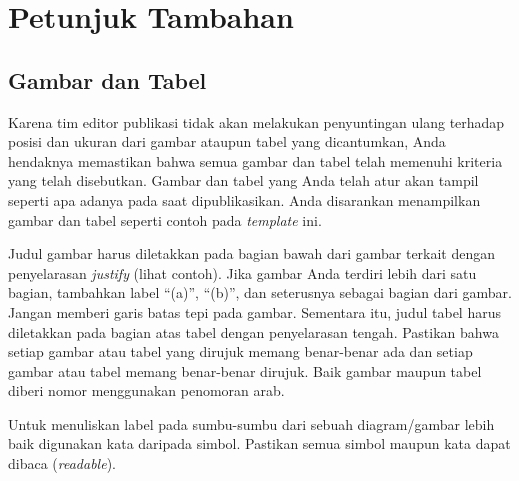 \documentclass{its-jurnal}
\begin{document}
\section{Petunjuk Tambahan}

\subsection{Gambar dan Tabel}
Karena tim editor publikasi tidak akan melakukan penyuntingan ulang terhadap posisi dan ukuran dari gambar ataupun tabel yang dicantumkan, Anda hendaknya memastikan bahwa semua gambar dan tabel telah memenuhi kriteria yang telah disebutkan. Gambar dan tabel yang Anda telah atur akan tampil seperti apa adanya pada saat dipublikasikan. Anda disarankan menampilkan gambar dan tabel seperti contoh pada \textit{template} ini.

Judul gambar harus diletakkan pada bagian bawah dari gambar terkait dengan penyelarasan \textit{justify} (lihat contoh). Jika gambar Anda terdiri lebih dari satu bagian, tambahkan label ``(a)'', ``(b)'', dan seterusnya sebagai bagian dari gambar. Jangan memberi garis batas tepi pada gambar. Sementara itu, judul tabel harus diletakkan pada bagian atas tabel dengan penyelarasan tengah. Pastikan bahwa setiap gambar atau tabel yang dirujuk memang benar-benar ada dan setiap gambar atau tabel memang benar-benar dirujuk. Baik gambar maupun tabel diberi nomor menggunakan penomoran arab.

Untuk menuliskan label pada sumbu-sumbu dari sebuah diagram/gambar lebih baik digunakan kata daripada simbol. Pastikan semua simbol maupun kata dapat dibaca (\textit{readable}).
\end{document}
